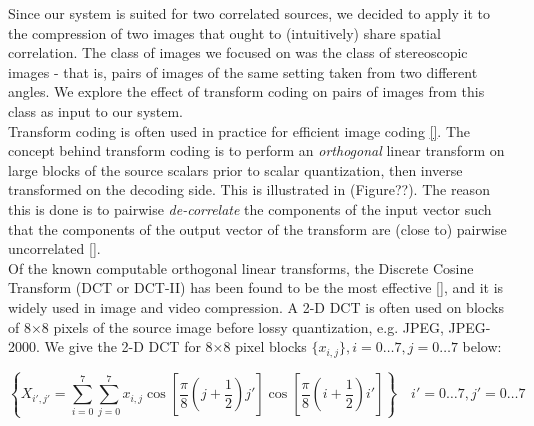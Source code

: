 \documentclass[10pt]{article}
\begin{document}
Since our system is suited for two correlated sources, we decided to apply it to the compression of two images that ought to (intuitively) share spatial correlation. The class of images we focused on was the class of stereoscopic images - that is, pairs of images of the same setting taken from two different angles. We explore the effect of transform coding on pairs of images from this class as input to our system.\\

Transform coding is often used in practice for efficient image coding \ref{}. The concept behind transform coding is to perform an \emph{orthogonal} linear transform on large blocks of the source scalars prior to scalar quantization, then inverse transformed on the decoding side. This is illustrated in (Figure??). The reason this is done is to pairwise \emph{de-correlate} the components of the input vector such that the components of the output vector of the transform are (close to) pairwise uncorrelated \ref{}.\\

Of the known computable orthogonal linear transforms, the Discrete Cosine Transform (DCT or DCT-II) has been found to be the most effective \ref{}, and it is widely used in image and video compression. A 2-D DCT is often used on blocks of 8$\times$8 pixels of the source image before lossy quantization, e.g. JPEG, JPEG-2000. We give the 2-D DCT for 8$\times$8 pixel blocks $\{x_{i,j}\}, i=0\ldots 7, j=0\ldots 7$ below:

\begin{equation}
    \left\{X_{i', j'}=\sum_{i=0}^7\sum_{j=0}^7
        x_{i,j}
            \cos\left[
                \frac{\pi}{8}\left(j+\frac{1}{2}\right)j'
            \right]
            \cos\left[
            \frac{\pi}{8}\left(i + \frac{1}{2}\right)i'
            \right]\right\}\quad i'=0\ldots 7, j'=0\ldots 7
\end{equation}
\end{document}
